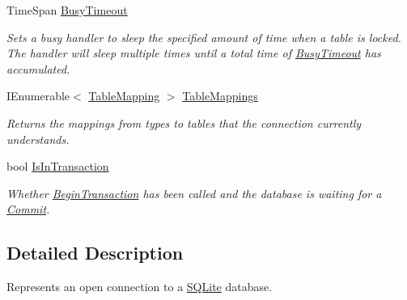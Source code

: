 \begin{DoxyCompactItemize}
\item 
Time\-Span \hyperlink{classSQLite_1_1SQLiteConnection_a825c0ebf745f8424ee0e8444b13cb6ff}{Busy\-Timeout}
\begin{DoxyCompactList}\small\item\em Sets a busy handler to sleep the specified amount of time when a table is locked. The handler will sleep multiple times until a total time of \hyperlink{classSQLite_1_1SQLiteConnection_a825c0ebf745f8424ee0e8444b13cb6ff}{Busy\-Timeout} has accumulated. \end{DoxyCompactList}\item 
I\-Enumerable$<$ \hyperlink{classSQLite_1_1TableMapping}{Table\-Mapping} $>$ \hyperlink{classSQLite_1_1SQLiteConnection_a72dd4f277b04c171222a199744aef32b}{Table\-Mappings}
\begin{DoxyCompactList}\small\item\em Returns the mappings from types to tables that the connection currently understands. \end{DoxyCompactList}\item 
bool \hyperlink{classSQLite_1_1SQLiteConnection_a82a4af3768596d6d0031110be9f56ae0}{Is\-In\-Transaction}
\begin{DoxyCompactList}\small\item\em Whether \hyperlink{classSQLite_1_1SQLiteConnection_aba3becdb524808bd49f349587f1b7049}{Begin\-Transaction} has been called and the database is waiting for a \hyperlink{classSQLite_1_1SQLiteConnection_a2c8187a19b5065f6b23c079e7cca29fe}{Commit}. \end{DoxyCompactList}\end{DoxyCompactItemize}


\subsection{Detailed Description}
Represents an open connection to a \hyperlink{namespaceSQLite}{S\-Q\-Lite} database. 



